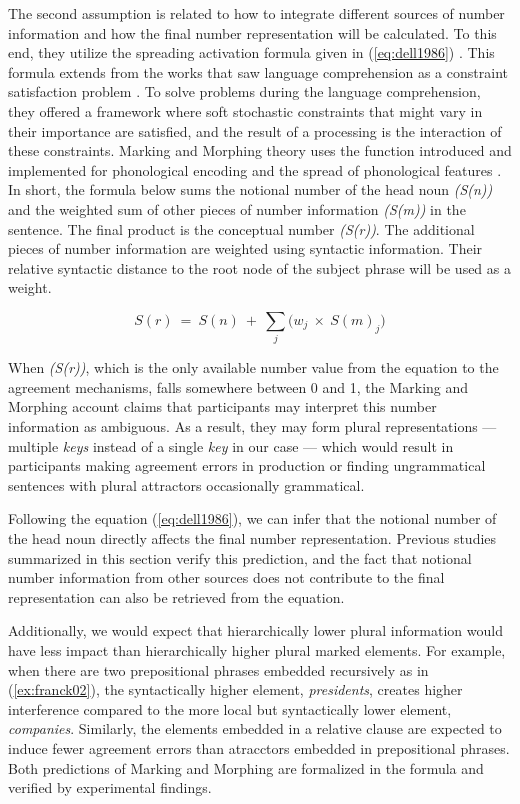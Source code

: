 The second assumption is related to how to integrate different sources of number information and how the final number representation will be calculated. To this end, they utilize the spreading activation formula given in (\ref{eq:dell1986}) \citep{Dell1986}. This formula extends from the works that saw language comprehension as a constraint satisfaction problem \citep{TrueswellTanenhaus94}. To solve problems during the language comprehension, they offered a framework where soft stochastic constraints that might vary in their importance are satisfied, and the result of a processing is the interaction of these constraints. Marking and Morphing theory uses the function  introduced and implemented for phonological encoding and the spread of phonological features \citep{Dell88}. In short, the formula below sums the notional number of the head noun \emph{(S(n))} and the weighted sum of other pieces of number information \emph{(S(m))} in the sentence. The final product is the conceptual number \emph{(S(r))}. The additional pieces of number information are weighted using syntactic information. Their relative syntactic distance to the root node of the subject phrase will be used as a weight.

\begin{equation} \label{eq:dell1986}
  S(r){\ }={\ }S(n){\ }+{\ }\sum_{j}\Big(w_j{\ }\times{\ }S(m)_j \Big)
\end{equation}

When \emph{(S(r))}, which is the only available number value from the equation to the agreement mechanisms, falls somewhere between 0 and 1, the Marking and Morphing account claims that participants may interpret this number information as ambiguous. As a result, they may form plural representations --- multiple \emph{keys} instead of a single \emph{key} in our case --- which would result in participants making agreement errors in production or finding ungrammatical sentences with plural attractors occasionally grammatical.  

Following the equation (\ref{eq:dell1986}), we can infer that the notional number of the head noun directly affects the final number representation. Previous studies summarized in this section verify this prediction, and the fact that notional number information from other sources does not contribute to the final representation can also be retrieved from the equation. 

Additionally, we would expect that hierarchically lower plural information would have less impact than hierarchically higher plural marked elements. For example, when there are two prepositional phrases embedded recursively as in (\ref{ex:franck02}), the syntactically higher element, \emph{presidents}, creates higher interference compared to the more local but syntactically lower element, \emph{companies}. Similarly, the elements embedded in a relative clause are expected to induce fewer agreement errors than atracctors embedded in prepositional phrases. Both predictions of Marking and Morphing are formalized in the formula and verified by experimental findings. 

